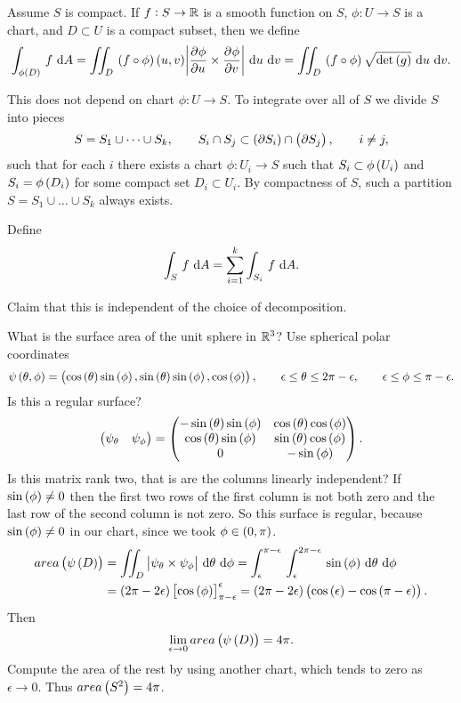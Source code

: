 \begin{definition}
Assume $ S $ is compact. If $ f : S \to \mathbb{R} $ is a smooth function on $ S $, $ \phi : U \to S $ is a chart, and $ D \subset U $ is a compact subset, then we define
$$ \intd{\phi\br{D}}{}{f}{A} = \iintd{D}{\br{f \circ \phi}\br{u, v}\abs{\dpd{\phi}{u} \times \dpd{\phi}{v}}}{u}{v} = \iintd{D}{\br{f \circ \phi}\sqrt{\det\br{g}}}{u}{v}. $$
\end{definition}

This does not depend on chart $ \phi : U \to S $. To integrate over all of $ S $ we divide $ S $ into pieces
$$ S = S_1 \cup \dots \cup S_k, \qquad S_i \cap S_j \subset \br{\partial S_i} \cap \br{\partial S_j}, \qquad i \ne j, $$
such that for each $ i $ there exists a chart $ \phi : U_i \to S $ such that $ S_i \subset \phi\br{U_i} $ and $ S_i = \phi\br{D_i} $ for some compact set $ D_i \subset U_i $. By compactness of $ S $, such a partition $ S = S_1 \cup \dots \cup S_k $ always exists.

\begin{definition}
Define
$$ \intd{S}{}{f}{A} = \sum_{i = 1}^k \intd{S_i}{}{f}{A}. $$
\end{definition}

Claim that this is independent of the choice of decomposition.


\begin{example*}
What is the surface area of the unit sphere in $ \mathbb{R}^3 $? Use spherical polar coordinates
$$ \psi\br{\theta, \phi} = \br{\cos\br{\theta}\sin\br{\phi}, \sin\br{\theta}\sin\br{\phi}, \cos\br{\phi}}, \qquad \epsilon \le \theta \le 2\pi - \epsilon, \qquad \epsilon \le \phi \le \pi - \epsilon. $$
Is this a regular surface?
$$ \onebytwo{\psi_\theta}{\psi_\phi} = \threebyone{-\sin\br{\theta}\sin\br{\phi} & \cos\br{\theta}\cos\br{\phi}}{\cos\br{\theta}\sin\br{\phi} & \sin\br{\theta}\cos\br{\phi}}{0 & -\sin\br{\phi}}. $$
Is this matrix rank two, that is are the columns linearly independent? If $ \sin\br{\phi} \ne 0 $ then the first two rows of the first column is not both zero and the last row of the second column is not zero. So this surface is regular, because $ \sin\br{\phi} \ne 0 $ in our chart, since we took $ \phi \in \br{0, \pi} $.
\begin{align*}
area\br{\psi\br{D}}
& = \iintd{D}{\abs{\psi_\theta \times \psi_\phi}}{\theta}{\phi}
= \intd{\epsilon}{\pi - \epsilon}{\intd{\epsilon}{2\pi - \epsilon}{\sin\br{\phi}}{\theta}}{\phi} \\
& = \br{2\pi - 2\epsilon}\sbr{\cos\br{\phi}}_{\pi - \epsilon}^\epsilon
= \br{2\pi - 2\epsilon}\br{\cos\br{\epsilon} - \cos\br{\pi - \epsilon}}.
\end{align*}
Then
$$ \lim_{\epsilon \to 0} area\br{\psi\br{D}} = 4\pi. $$
Compute the area of the rest by using another chart, which tends to zero as $ \epsilon \to 0 $. Thus $ area\br{S^2} = 4\pi $.
\end{example*}

